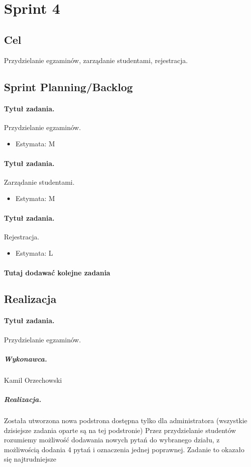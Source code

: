 \documentclass[a4paper]{article}
\begin{document}
\section{Sprint 4}

\subsection{Cel} Przydzielanie egzaminów, zarządanie studentami, rejestracja. 

\subsection{Sprint Planning/Backlog}

\paragraph{Tytuł zadania.} Przydzielanie egzaminów.
\begin{itemize}
\item Estymata: M
\end{itemize} 

\paragraph{Tytuł zadania.} Zarządanie studentami.
\begin{itemize}
\item Estymata: M
\end{itemize} 

\paragraph{Tytuł zadania.} Rejestracja.
\begin{itemize}
\item Estymata: L
\end{itemize} 

\paragraph{Tutaj dodawać kolejne zadania}

\subsection{Realizacja}

\paragraph{Tytuł zadania.} Przydzielanie egzaminów.
\subparagraph{Wykonawca.} Kamil Orzechowski
\subparagraph{Realizacja.} Została utworzona nowa podstrona dostępna tylko dla administratora (wszystkie dzisiejsze zadania oparte są na tej podstronie) Przez przydzielanie studentów rozumiemy możliwość dodawania nowych pytań do wybranego działu, z możliwością dodania 4 pytań i oznaczenia jednej poprawnej. Zadanie to okazało się najtrudniejsze 
\end{document}
